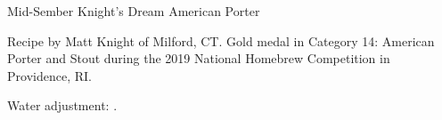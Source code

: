 \begin{recipe}{Mid-Sember Knight's Dream American Porter} %

\begin{aboutblock}
Recipe by Matt Knight of Milford, CT. Gold medal in Category 14: American
Porter and Stout during the 2019 National Homebrew Competition in
Providence, RI. \sourceaha
\end{aboutblock}


\begin{methodandtiming}
 
\begin{mashsteps}
\end{mashsteps}

\begin{fermentationsteps}
\end{fermentationsteps}

\begin{directions}
Water adjustment: .
\end{directions}

\end{methodandtiming}

\recipebreak

\begin{ingredientsblock}

\begin{malts}
\end{malts}

\begin{hops}
\end{hops}


\end{ingredientsblock}

\end{recipe}

